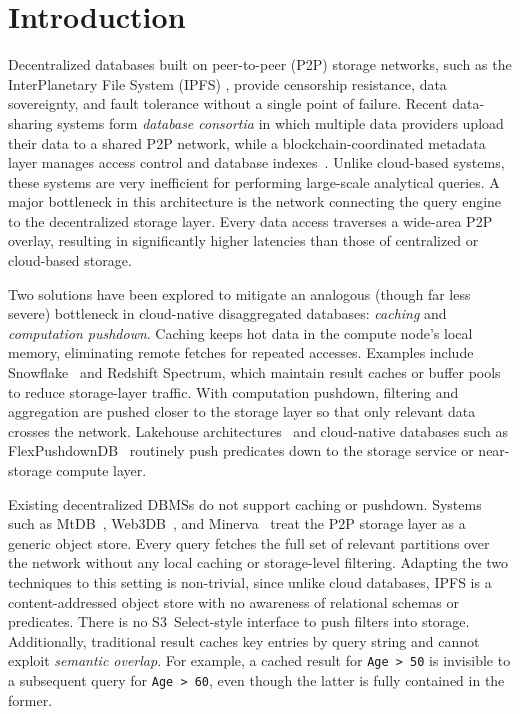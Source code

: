 \section{Introduction}

Decentralized databases built on peer-to-peer (P2P) storage networks, such as the InterPlanetary File System (IPFS) \cite{benet2014ipfs}, provide censorship resistance, data sovereignty, and fault tolerance without a single point of failure. Recent data-sharing systems form \emph{database consortia} in which multiple data providers upload their data to a shared P2P network, while a blockchain-coordinated metadata layer manages access control and database indexes~\cite {hossain2025mtdb, mukherjee2025web3db}. Unlike cloud-based systems\cite{dageville2016snowflake,hunt2018s3, pandis2021evolution}, these systems are very inefficient for performing large-scale analytical queries. A major bottleneck in this architecture is the network connecting the query engine to the decentralized storage layer. Every data access traverses a wide-area P2P overlay, resulting in significantly higher latencies than those of centralized or cloud-based storage.

Two solutions have been explored to mitigate an analogous (though far less severe) bottleneck in cloud-native disaggregated databases: \emph{caching} and \emph{computation pushdown}. Caching keeps hot data in the compute node's local memory, eliminating remote fetches for repeated accesses. Examples include Snowflake~\cite{dageville2016snowflake} and Redshift Spectrum\cite{pandis2021evolution}, which maintain result caches or buffer pools to reduce storage-layer traffic. With computation pushdown, filtering and aggregation are pushed closer to the storage layer so that only relevant data crosses the network. Lakehouse architectures~\cite{armbrust2021lakehouse} and cloud-native databases such as FlexPushdownDB~\cite{yang2021flexpushdowndb} routinely push predicates down to the storage service or near-storage compute layer.

Existing decentralized DBMSs do not support caching or pushdown. Systems such as MtDB~\cite{hossain2025mtdb}, Web3DB~\cite{mukherjee2025web3db}, and Minerva~\cite{yao2024minerva} treat the P2P storage layer as a generic object store. Every query fetches the full set of relevant partitions over the network without any local caching or storage-level filtering. Adapting the two techniques to this setting is non-trivial, since unlike cloud databases, IPFS is a content-addressed object store with no awareness of relational schemas or predicates. There is no S3~Select-style\cite{hunt2018s3} interface to push filters into storage. Additionally, traditional result caches key entries by query string and cannot exploit \emph{semantic overlap}. For example, a cached result for \texttt{Age~>~50} is invisible to a subsequent query for \texttt{Age~>~60}, even though the latter is fully contained in the former.

